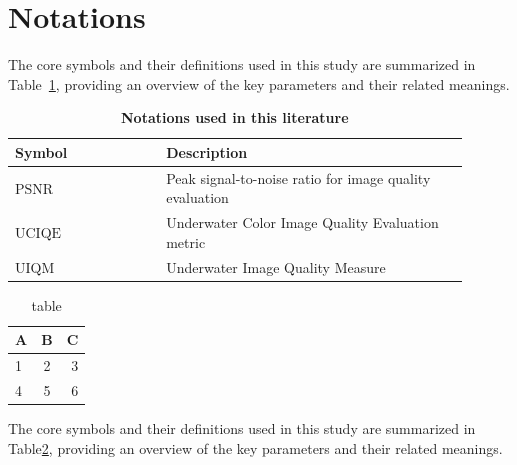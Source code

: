 \newpage
\section{Notations}
\setlength{\parindent}{2em} %


The core symbols and their definitions used in this study are summarized in Table~\ref{table:notations}, providing an overview of the key parameters and their related meanings.

\begin{table}[ht]
	\centering
	\caption{\textbf{Notations used in this literature}}
	\renewcommand{\arraystretch}{1.5} %
	\begin{tabular}{>{\centering\arraybackslash}p{0.3\linewidth} >{\centering\arraybackslash}p{0.6\linewidth}} %
		\toprule %
		\textbf{Symbol} & \textbf{Description} \\ 
		\midrule %
		
		$\text{PSNR}$    & Peak signal-to-noise ratio for image quality evaluation \\
		
		$\text{UCIQE}$   & Underwater Color Image Quality Evaluation metric \\
		
		$\text{UIQM}$    & Underwater Image Quality Measure \\
		
		
		\bottomrule %
	\end{tabular}
	\label{table:notations}
\end{table}




\begin{table}[h]
	\centering
	\caption{table}
	\label{table}
	\begin{tabular}{lcr}
		\toprule
		A&B&C\\
		\midrule
		1&2&3\\
		4&5&6\\
		\bottomrule		
	\end{tabular}
\end{table}


The core symbols and their definitions used in this study are summarized in Table\ref{table}, providing an overview of the key parameters and their related meanings.

